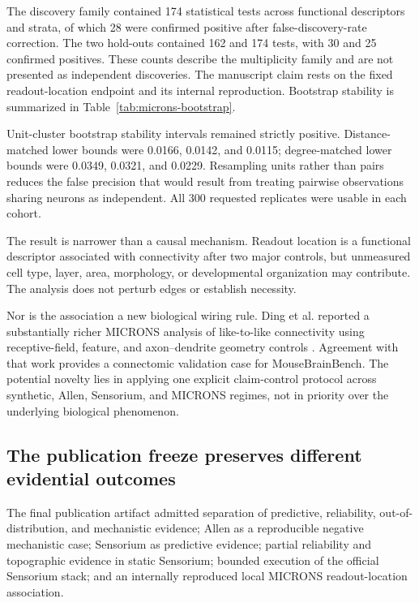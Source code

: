 The discovery family contained 174 statistical tests across functional
descriptors and strata, of which 28 were confirmed positive after
false-discovery-rate correction. The two hold-outs contained 162 and 174 tests,
with 30 and 25 confirmed positives. These counts describe the multiplicity
family and are not presented as independent discoveries. The manuscript claim
rests on the fixed readout-location endpoint and its internal reproduction. Bootstrap
stability is summarized in Table~\ref{tab:microns-bootstrap}.



Unit-cluster bootstrap stability intervals remained strictly positive. Distance-matched
lower bounds were 0.0166, 0.0142, and 0.0115; degree-matched lower bounds were
0.0349, 0.0321, and 0.0229. Resampling units rather than pairs reduces the false
precision that would result from treating pairwise observations sharing neurons
as independent. All 300 requested replicates were usable in each cohort.

The result is narrower than a causal mechanism. Readout location is a functional
descriptor associated with connectivity after two major controls, but unmeasured
cell type, layer, area, morphology, or developmental organization may
contribute. The analysis does not perturb edges or establish necessity.

Nor is the association a new biological wiring rule. Ding et al. reported a
substantially richer MICRONS analysis of like-to-like connectivity using
receptive-field, feature, and axon--dendrite geometry controls
\citep{ding2025wiring}. Agreement with that work provides a connectomic validation
case for MouseBrainBench. The potential novelty lies in applying one explicit
claim-control protocol across synthetic, Allen, Sensorium, and MICRONS regimes,
not in priority over the underlying biological phenomenon.

\subsection{The publication freeze preserves different evidential outcomes}
\label{subsec:results-publication-freeze}

The final publication artifact admitted separation of predictive, reliability,
out-of-distribution, and mechanistic evidence; Allen as a reproducible negative
mechanistic case; Sensorium as predictive evidence; partial reliability and
topographic evidence in static Sensorium; bounded execution of the official
Sensorium stack; and an internally reproduced local MICRONS readout-location association.

